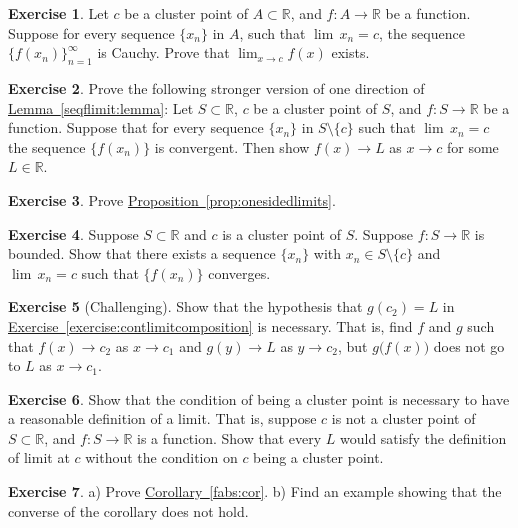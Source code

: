 \documentclass[12pt]{book}
\newcommand{\R}{{\mathbb{R}}}
\theoremstyle{plain}
\theoremstyle{remark}
\theoremstyle{definition}
\theoremstyle{exercise}
\newtheorem{exercise}{Exercise}[section]
\theoremstyle{example}
\newcommand{\exerciseref}[1]{\hyperref[#1]{Exercise~\ref*{#1}}}
\newcommand{\propref}[1]{\hyperref[#1]{Proposition~\ref*{#1}}}
\newcommand{\lemmaref}[1]{\hyperref[#1]{Lemma~\ref*{#1}}}
\newcommand{\corref}[1]{\hyperref[#1]{Corollary~\ref*{#1}}}
\begin{document}
\begin{exercise}
Let $c$ be a cluster point of $A \subset \R$, and $f \colon A \to \R$
be a function.  Suppose for every sequence $\{x_n\}$ in $A$,
such that $\lim\, x_n = c$,
the sequence $\{ f(x_n) \}_{n=1}^\infty$ is Cauchy.  Prove that
$\lim_{x\to c} f(x)$ exists.
\end{exercise}

\begin{exercise} \label{exercise:seqflimitalt}
Prove the following stronger version of one direction of
\lemmaref{seqflimit:lemma}:
Let $S \subset \R$, $c$ be a cluster point of $S$, and $f \colon S \to
\R$ be a function.
Suppose that for every sequence $\{x_n\}$ in $S \setminus \{c\}$ such that
$\lim\, x_n = c$ the sequence $\{ f(x_n) \}$ is convergent.
Then show $f(x) \to L$ as $x \to c$ for some $L \in \R$.
\end{exercise}

\begin{exercise}
Prove \propref{prop:onesidedlimits}.
\end{exercise}

\begin{exercise}
Suppose $S \subset \R$ and $c$ is a cluster point of $S$.  Suppose $f \colon
S \to \R$ is bounded.  Show that there exists a sequence $\{ x_n \}$
with $x_n \in S \setminus \{ c \}$ and $\lim\, x_n = c$ such that
$\{ f(x_n) \}$ converges.
\end{exercise}

\begin{exercise}[Challenging] \label{exercise:contlimitbadcomposition}
Show that the hypothesis that $g(c_2) = L$ in
\exerciseref{exercise:contlimitcomposition} is necessary.  That is, find $f$
and $g$ such that $f(x) \to c_2$ as $x \to c_1$ and
$g(y) \to L$ as $y \to c_2$, but $g\bigl(f(x)\bigr)$ does not go to $L$
as $x \to c_1$.
\end{exercise}

\begin{exercise}
Show that the condition of being a cluster point is necessary to have a
reasonable definition of a limit.  That is, suppose $c$ is not a cluster
point of $S \subset \R$, and $f \colon S \to \R$ is a function.  Show that
every $L$ would satisfy the definition of limit at $c$ without the condition
on $c$ being a cluster point.
\end{exercise}

\begin{exercise}
a) Prove \corref{fabs:cor}.  b) Find an example showing that the converse of
the corollary does not hold.
\end{exercise}
\end{document}
